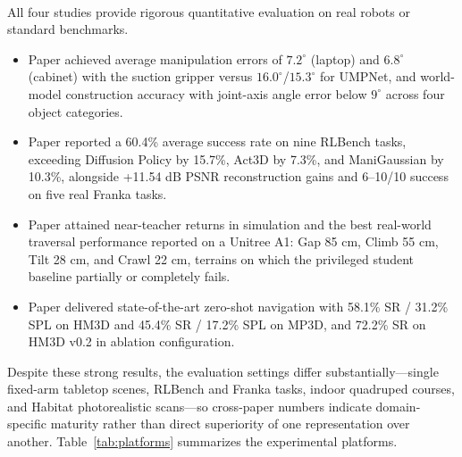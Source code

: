 \documentclass[12pt,a4paper,final]{extreport}
\begin{document}
\paragraph{} All four studies provide rigorous quantitative evaluation on real robots or standard benchmarks.
\begin{itemize}
  \item Paper \cite{p1} achieved average manipulation errors of $7.2^{\circ}$ (laptop) and $6.8^{\circ}$ (cabinet) with the suction gripper versus $16.0^{\circ}$/$15.3^{\circ}$ for UMPNet, and world-model construction accuracy with joint-axis angle error below $9^{\circ}$ across four object categories.
  \item Paper \cite{p2} reported a 60.4\% average success rate on nine RLBench tasks, exceeding Diffusion Policy by 15.7\%, Act3D by 7.3\%, and ManiGaussian by 10.3\%, alongside +11.54 dB PSNR reconstruction gains and 6--10/10 success on five real Franka tasks.
  \item Paper \cite{p3} attained near-teacher returns in simulation and the best real-world traversal performance reported on a Unitree A1: Gap 85 cm, Climb 55 cm, Tilt 28 cm, and Crawl 22 cm, terrains on which the privileged student baseline partially or completely fails.
  \item Paper \cite{p4} delivered state-of-the-art zero-shot navigation with 58.1\% SR / 31.2\% SPL on HM3D and 45.4\% SR / 17.2\% SPL on MP3D, and 72.2\% SR on HM3D v0.2 in ablation configuration.
\end{itemize}
Despite these strong results, the evaluation settings differ substantially---single fixed-arm tabletop scenes, RLBench and Franka tasks, indoor quadruped courses, and Habitat photorealistic scans---so cross-paper numbers indicate domain-specific maturity rather than direct superiority of one representation over another. Table~\ref{tab:platforms} summarizes the experimental platforms.
\end{document}
